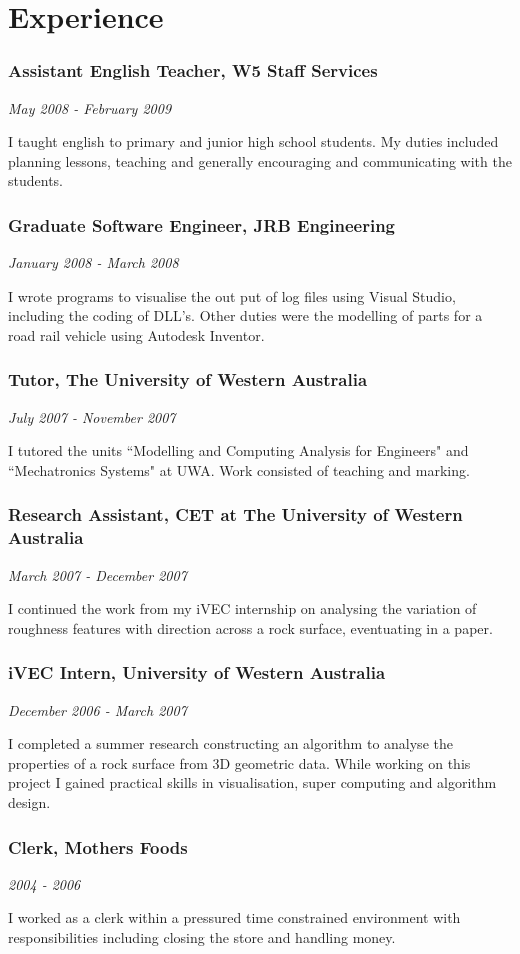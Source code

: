 \documentclass[10pt, a4paper]{report}
\newcommand{\engineering}[1]{}
\renewcommand{\engineering}[1]{#1}
\newcommand{\wh}[5]{\subsubsection*{#2, #3} {\em #1} \\ \parbox[t]{14cm}{#5} }
\begin{document}
\begin{minipage}[t]{14.5cm}
\section*{Experience}
\wh{May 2008 - February 2009}
{Assistant English Teacher}
{W5 Staff Services}
{Hanaguruma bldg. Kitakan 3F\\
5-4-14 Meieki, Nakamura-ku\\
Nagoya-shi, Aichi, Japan}
{I taught english to primary and junior high school students. My duties included planning lessons, teaching and generally encouraging and communicating with the students.}

\engineering{
\wh{January 2008 - March 2008}
{Graduate Software Engineer}
{JRB Engineering}
{24 Drummond Pl. \\ West Perth WA 6005\\ Australia}
{ I wrote programs to visualise the out put of log files using Visual Studio, including the coding of DLL's. Other duties were the modelling of parts for a road rail vehicle using Autodesk Inventor.}}

\wh{July 2007 - November 2007}
{Tutor}
{The University of Western Australia}
{35 Stirling Hwy.\\ Crawley WA 6009\\ Australia}
{I tutored the units ``Modelling and Computing Analysis for Engineers" and ``Mechatronics Systems" at UWA. Work consisted of teaching and marking.}

\wh{March 2007 - December 2007}
{Research Assistant}
{CET at The University of Western Australia}
{35 Stirling Hwy.\\ Crawley WA 6009\\ Australia}
{I continued the work from my iVEC internship on analysing the variation of roughness features with direction across a rock surface, eventuating in a paper.}

\engineering{\wh{December 2006 - March 2007}
{iVEC Intern}
{University of  Western Australia}
{35 Stirling Hwy.\\ Crawley WA 6009\\ Australia}
{I completed a summer research constructing an algorithm to analyse the properties of a rock surface from 3D geometric data. While working on this project I gained practical skills in visualisation, super computing and algorithm design.}

\wh{2004 - 2006}
{Clerk}
{Mothers Foods}
{Nedlands WA\\ Australia}
{I worked as a clerk within a pressured time constrained environment with responsibilities including closing the store and handling money.}}


\end{minipage}
\end{document}
